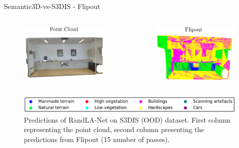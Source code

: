 \documentclass[aspectratio=169]{beamer}
\begin{document}
\begin{frame}{Semantic3D-vs-S3DIS - Flipout}
    \begin{columns}
        \begin{column}{0.5\textwidth}
            \begin{figure}
                \centering
                \includegraphics[scale=0.5]{images/s3dis/s3dis_fout_orig_head.png}
                \includegraphics[scale=0.5]{images/s3dis/s3dis_fout_orig.png}
            \end{figure}
        \end{column}
        \begin{column}{0.5\textwidth}
            \begin{figure}
                \centering
                \includegraphics[scale=0.5]{images/s3dis/s3dis_fout_semseg_head.png}
                \includegraphics[scale=0.5]{images/s3dis/s3dis_fout_semseg.png}
            \end{figure}
        \end{column}
    \end{columns}
    \begin{figure}
        \centering
        \includegraphics[scale=0.25]{images/legend.jpg}
        \caption{Predictions of RandLA-Net on S3DIS (OOD) dataset. First column representing the point
        cloud, second column presenting the predictions from Flipout (15 number of passes).}
    \end{figure}
\end{frame}
\end{document}
